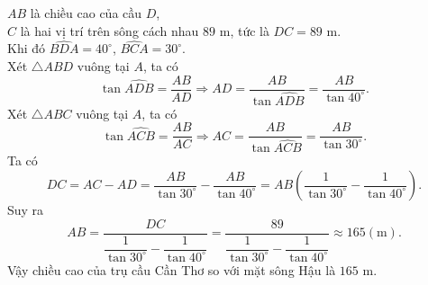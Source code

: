 \begin{ex}
{\begin{center}
	\end{center}
	$AB$ là chiều cao của cầu $D$,\\ 
	$C$ là hai vị trí trên sông cách nhau $89$ m, tức là $DC = 89$ m.\\ 
	Khi đó $\widehat{BDA} = 40^\circ$, $\widehat{BCA} = 30^\circ$.\\
	Xét $\triangle ABD$ vuông tại $A$, ta có 
	\[
	\tan \widehat{ADB} = \dfrac{AB}{AD} \Rightarrow AD = \dfrac{AB}{\tan \widehat{ADB}} = \dfrac{AB}{\tan 40^\circ}.
	\] 
	Xét $\triangle ABC$ vuông tại $A$, ta có
	\[
	\tan \widehat{ACB} = \dfrac{AB}{AC} \Rightarrow AC = \dfrac{AB}{\tan \widehat{ACB}} = \dfrac{AB}{\tan 30^\circ}.
	\] 
	Ta có
	\[
	DC = AC - AD = \dfrac{AB}{\tan 30^\circ} - \dfrac{AB}{\tan 40^\circ} = AB\left(\dfrac{1}{\tan 30^\circ} - \dfrac{1}{\tan 40^\circ}\right).
	\] 
	Suy ra 
	\[
	AB = \dfrac{DC}{\dfrac{1}{\tan 30^\circ} - \dfrac{1}{\tan 40^\circ}} = \dfrac{89}{\dfrac{1}{\tan 30^\circ} - \dfrac{1}{\tan 40^\circ}} \approx 165\left(\mathrm{m}\right) .
	\]
	Vậy chiều cao của trụ cầu Cần Thơ so với mặt sông Hậu là $165$ m.
	}
\end{ex}
